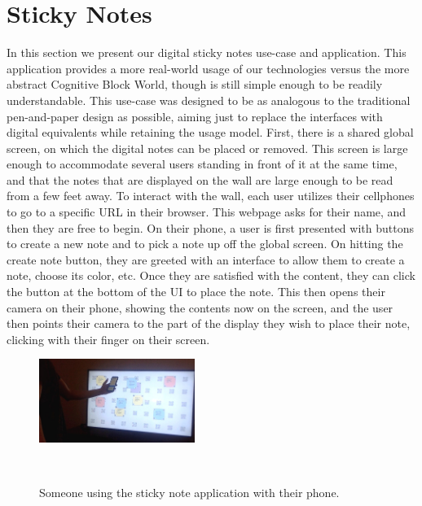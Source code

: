 \section{Sticky Notes}

In this section we present our digital sticky notes use-case and application. This application provides
a more real-world usage of our technologies versus the more abstract Cognitive Block World, though is
still simple enough to be readily understandable. This use-case was designed to be as analogous to the
traditional pen-and-paper design as possible, aiming just to replace the interfaces with digital equivalents
while retaining the usage model. First, there is a shared global screen, on which the digital notes can be placed
or removed. This screen is large enough to accommodate several users standing in front of it at the same time,
and that the notes that are displayed on the wall are large enough to be read from a few feet away. To interact
with the wall, each user utilizes their cellphones to go to a specific URL in their browser. This webpage
asks for their name, and then they are free to begin. On their phone, a user is
first presented with buttons to create a new note and to pick a note up off the global screen. On hitting the
create note button, they are greeted with an interface to allow them to create a note, choose its color, etc.
Once they are satisfied with the content, they can click the button at the bottom of the UI to place the note.
This then opens their camera on their phone, showing the contents now on the screen, and the user then points
their camera to the part of the display they wish to place their note, clicking with their finger on their screen.

\begin{figure}
    \centering
    \includegraphics[width=0.45\textwidth]{figures/person_using}
    \caption{Someone using the sticky note application with their phone.}
      ~\label{fig:someone_using}
\end{figure}
